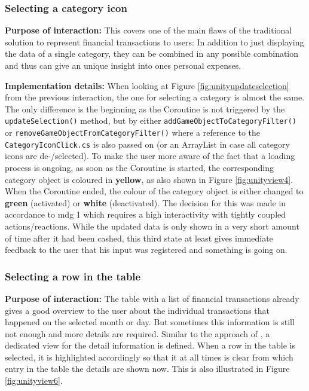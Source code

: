 \subsubsection{Selecting a category icon}

\textbf{Purpose of interaction:} This covers one of the main flaws of the traditional solution to represent financial transactions to users: In addition to just displaying the data of a single category, they can be combined in any possible combination  and thus can give an unique insight into ones personal expenses. 

\textbf{Implementation details:} When looking at Figure \ref{fig:unityupdateselection} from the previous interaction, the one for selecting a category is almost the same. The only difference is the beginning as the Coroutine is not triggered by the \texttt{updateSelection()} method, but by either \texttt{addGameObjectToCategoryFilter()} or \texttt{removeGameObjectFromCategoryFilter()} where a reference to the \texttt{CategoryIconClick.cs} is also passed on (or an ArrayList in case all category icons are de-/selected). To make the user more aware of the fact that a loading process is ongoing, as soon as the Coroutine is started, the corresponding category object is coloured in \textbf{yellow}, as also shown in Figure \ref{fig:unityview4}. When the Coroutine ended, the colour of the category object is either changed to \textbf{green} (activated) or \textbf{white} (deactivated). The decision for this was made in accordance to \gls{mdg} 1 which requires a high interactivity with tightly coupled actions/reactions. While the updated data is only shown in a very short amount of time after it had been cashed, this third state at least gives immediate feedback to the user that his input was registered and something is going on.


\subsubsection{Selecting a row in the table}

\textbf{Purpose of interaction:} The table with a list of financial transactions already gives a good overview to the user about the individual transactions that happened on the selected month or day. But sometimes this information is still not enough and more details are required. Similar to the approach of \cite{CodeScience2015}, a dedicated view for the detail information is defined. When a row in the table is selected, it is highlighted accordingly so that it at all times is clear from which entry in the table the details are shown now. This is also illustrated in Figure \ref{fig:unityview6}.

